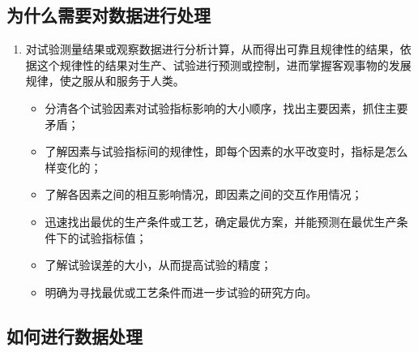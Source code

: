 \documentclass[UTF8]{ctexart}
\begin{document}
\subsection{为什么需要对数据进行处理}
\begin{enumerate}[•]
\item 对试验测量结果或观察数据进行分析计算，从而得出可靠且规律性的结果，依据这个规律性的结果对生产、试验进行预测或控制，进而掌握客观事物的发展规律，使之服从和服务于人类。
\begin{itemize}
\item 分清各个试验因素对试验指标影响的大小顺序，找出主要因素，抓住主要矛盾；
\item 了解因素与试验指标间的规律性，即每个因素的水平改变时，指标是怎么样变化的；
\item 了解各因素之间的相互影响情况，即因素之间的交互作用情况；
\item 迅速找出最优的生产条件或工艺，确定最优方案，并能预测在最优生产条件下的试验指标值；
\item 了解试验误差的大小，从而提高试验的精度；
\item 明确为寻找最优或工艺条件而进一步试验的研究方向。
\end{itemize}
\end{enumerate}

\subsection{如何进行数据处理}
\end{document}

